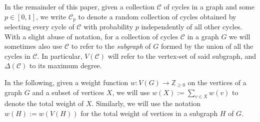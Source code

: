 \documentclass[11pt,reqno]{article}
\begin{document}
In the remainder of this paper, given a collection $\mathcal C$ of cycles in a graph and some $p\in [0,1]$, we write $\mathcal C_p$ to denote a random collection of cycles obtained by selecting every cycle of $\mathcal C$ with probability $p$ independently of all other cycles. With a slight abuse of notation, for a collection of cycles $\mathcal{C}$ in a graph $G$ we will sometimes also use $\mathcal{C}$ to refer to the \emph{subgraph} of $G$ formed by the union of all the cycles in $\mathcal{C}$. In particular, $V(\mathcal{C})$ will refer to the vertex-set of said subgraph, and $\Delta(\mathcal{C})$ to its maximum degree.

In the following, given a weight function $w:V(G)\rightarrow \mathbb{Z}_{\ge 0}$ on the vertices of a graph $G$ and a subset of vertices $X$, we will use $w(X):=\sum_{v\in X}w(v)$ to denote the total weight of $X$. Similarly, we will use the notation $w(H):=w(V(H))$ for the total weight of vertices in a subgraph $H$ of $G$.
\end{document}
